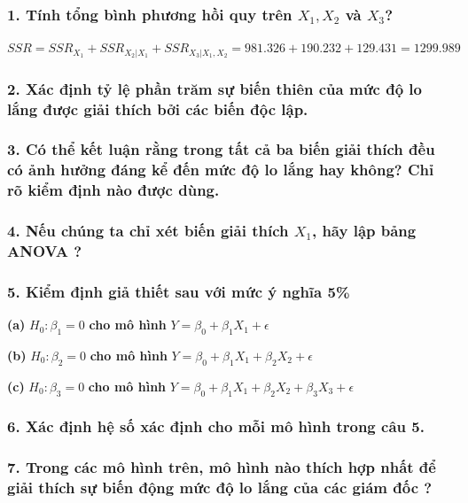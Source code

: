 \documentclass[a4paper]{article}
\theoremstyle{nonumberplain}
\begin{document}
\subsubsection*{1. Tính tổng bình phương hồi quy trên $X_1, X_2$ và $X_3$?}
$SSR = SSR_{X_1} + SSR_{X_2|X_1} + SSR_{X_3|X_1,X_2} = 981.326 + 190.232 + 129.431 = 1299.989$
\subsubsection*{2. Xác định tỷ lệ phần trăm sự biến thiên của mức độ lo lắng được giải thích bởi các biến
độc lập.}

\subsubsection*{3. Có thể kết luận rằng trong tất cả ba biến giải thích đều có ảnh hưởng đáng kể đến mức
độ lo lắng hay không? Chỉ rõ kiểm định nào được dùng.}

\subsubsection*{4. Nếu chúng ta chỉ xét biến giải thích $X_1$, hãy lập bảng ANOVA ?}


\subsubsection*{5. Kiểm định giả thiết sau với mức ý nghĩa 5\%}


\textbf{(a)} $H_0 : \beta_1 = 0$ \textbf{cho mô hình } $Y = \beta_0 + \beta_1 X_1 + \epsilon $


\textbf{(b)} $H_0 : \beta_2 = 0$ \textbf{cho mô hình } $Y = \beta_0 + \beta_1 X_1 + \beta_2 X_2 + \epsilon $


\textbf{(c)} $H_0 : \beta_3 = 0$ \textbf{cho mô hình } $Y = \beta_0 + \beta_1 X_1 + \beta_2 X_2 + \beta_3 X_3 + \epsilon $

\subsubsection*{6. Xác định hệ số xác định cho mỗi mô hình trong câu 5.}

\subsubsection*{7. Trong các mô hình trên, mô hình nào thích hợp nhất để giải thích sự biến động mức độ lo lắng của các giám đốc ?}
\end{document}
